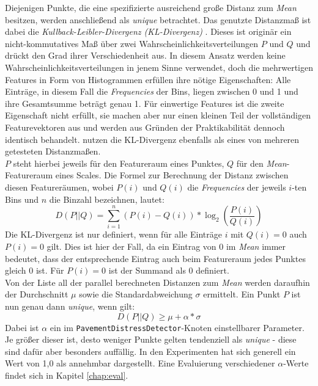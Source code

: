Diejenigen Punkte, die eine spezifizierte ausreichend große Distanz zum \textit{Mean} besitzen, werden anschließend als \textit{unique} betrachtet. Das genutzte Distanzmaß ist dabei die \textit{Kullback-Leibler-Divergenz (KL-Divergenz)} \citep{Kullback.Leibler-1951}. Dieses ist originär ein nicht-kommutatives Maß über zwei Wahrscheinlichkeitsverteilungen $P$ und $Q$ und drückt den Grad ihrer Verschiedenheit aus. In diesem Ansatz werden keine Wahrscheinlichkeitsverteilungen in jenem Sinne verwendet, doch die mehrwertigen Features in Form von Histogrammen erfüllen ihre nötige Eigenschaften: Alle Einträge, in diesem Fall die \textit{Frequencies} der Bins, liegen zwischen 0 und 1 und ihre Gesamtsumme beträgt genau 1. Für einwertige Features ist die zweite Eigenschaft nicht erfüllt, sie machen aber nur einen kleinen Teil der vollständigen Featurevektoren aus und werden aus Gründen der Praktikabilität dennoch identisch behandelt. \cite{Rusu.etal-2008} nutzen die KL-Divergenz ebenfalls als eines von mehreren getesteten Distanzmaßen. \\
$P$ steht hierbei jeweils für den Featureraum eines Punktes, $Q$ für den \textit{Mean}-Featureraum eines Scales. Die Formel zur Berechnung der Distanz zwischen diesen Featureräumen, wobei $P(i)$ und $Q(i)$ die \textit{Frequencies} der jeweils $i$-ten Bins und $n$ die Binzahl bezeichnen, lautet:
\begin{equation}    
    D(P || Q) = \sum_{i=1}^{n}{(P(i) - Q(i)) * \log_2\left(\frac{P(i)}{Q(i)}\right)}
\end{equation}
Die KL-Divergenz ist nur definiert, wenn für alle Einträge $i$ mit $Q(i)=0$ auch $P(i)=0$ gilt. Dies ist hier der Fall, da ein Eintrag von 0 im \textit{Mean} immer bedeutet, dass der entsprechende Eintrag auch beim Featureraum jedes Punktes gleich 0 ist. Für $P(i)=0$ ist der Summand als 0 definiert. \\
Von der Liste all der parallel berechneten Distanzen zum \textit{Mean} werden daraufhin der Durchschnitt $\mu$ sowie die Standardabweichung $\sigma$ ermittelt. Ein Punkt $P$ ist nun genau dann \textit{unique}, wenn gilt:
\begin{equation}
    D(P || Q) \geq \mu + \alpha * \sigma
\end{equation}
Dabei ist $\alpha$ ein im \texttt{PavementDistressDetector}-Knoten einstellbarer Parameter. Je größer dieser ist, desto weniger Punkte gelten tendenziell als \textit{unique} - diese sind dafür aber besonders auffällig. In den Experimenten hat sich generell ein Wert von 1,0 als annehmbar dargestellt. Eine Evaluierung verschiedener $\alpha$-Werte findet sich in Kapitel \ref{chap:eval}. \\\\
